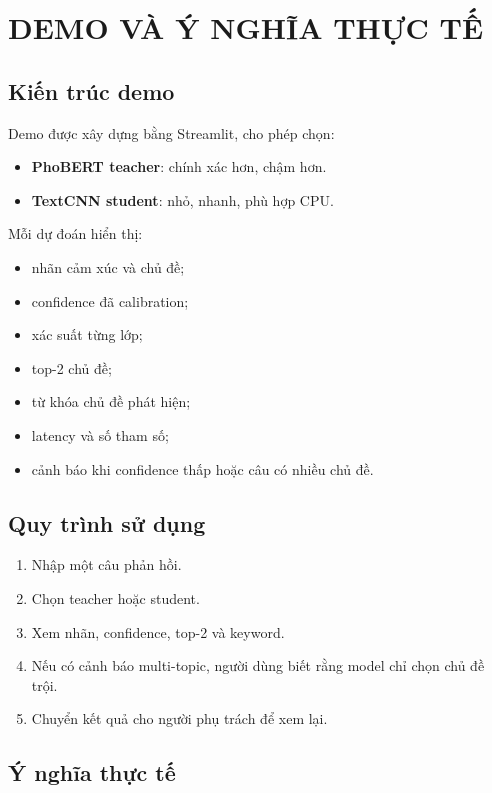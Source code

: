 \documentclass[12pt,a4paper]{report}
\begin{document}
\chapter{DEMO VÀ Ý NGHĨA THỰC TẾ}

\section{Kiến trúc demo}

Demo được xây dựng bằng Streamlit, cho phép chọn:

\begin{itemize}[leftmargin=1.2cm]
  \item \textbf{PhoBERT teacher}: chính xác hơn, chậm hơn.
  \item \textbf{TextCNN student}: nhỏ, nhanh, phù hợp CPU.
\end{itemize}

Mỗi dự đoán hiển thị:

\begin{itemize}[leftmargin=1.2cm]
  \item nhãn cảm xúc và chủ đề;
  \item confidence đã calibration;
  \item xác suất từng lớp;
  \item top-2 chủ đề;
  \item từ khóa chủ đề phát hiện;
  \item latency và số tham số;
  \item cảnh báo khi confidence thấp hoặc câu có nhiều chủ đề.
\end{itemize}

\section{Quy trình sử dụng}

\begin{enumerate}[leftmargin=1.2cm]
  \item Nhập một câu phản hồi.
  \item Chọn teacher hoặc student.
  \item Xem nhãn, confidence, top-2 và keyword.
  \item Nếu có cảnh báo multi-topic, người dùng biết rằng model chỉ chọn chủ đề trội.
  \item Chuyển kết quả cho người phụ trách để xem lại.
\end{enumerate}

\section{Ý nghĩa thực tế}
\end{document}
